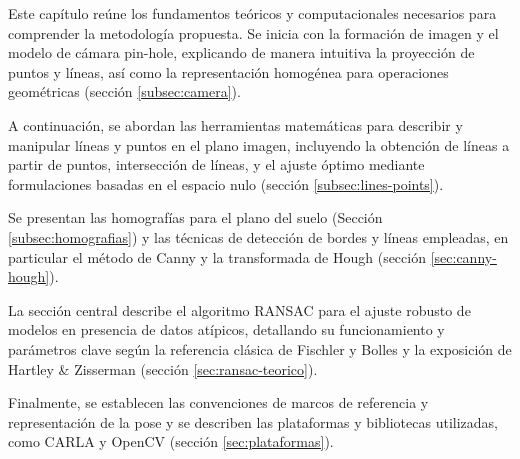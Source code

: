 Este capítulo reúne los fundamentos teóricos y computacionales necesarios para comprender la metodología propuesta. Se inicia con la formación de imagen y el modelo de cámara pin-hole, explicando de manera intuitiva la proyección de puntos y líneas, así como la representación homogénea para operaciones geométricas (sección \ref{subsec:camera}).

A continuación, se abordan las herramientas matemáticas para describir y manipular líneas y puntos en el plano imagen, incluyendo la obtención de líneas a partir de puntos, intersección de líneas, y el ajuste óptimo mediante formulaciones basadas en el espacio nulo (sección \ref{subsec:lines-points}).

Se presentan las homografías para el plano del suelo (Sección \ref{subsec:homografias}) y las técnicas de detección de bordes y líneas empleadas, en particular el método de Canny y la transformada de Hough (sección \ref{sec:canny-hough}).

La sección central describe el algoritmo RANSAC para el ajuste robusto de modelos en presencia de datos atípicos, detallando su funcionamiento y parámetros clave según la referencia clásica de Fischler y Bolles y la exposición de Hartley \& Zisserman (sección \ref{sec:ransac-teorico}).

Finalmente, se establecen las convenciones de marcos de referencia y representación de la pose y se describen las plataformas y bibliotecas utilizadas, como CARLA y OpenCV (sección \ref{sec:plataformas}).

